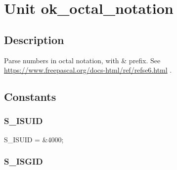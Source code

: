 \documentclass{report}
\newif\ifpdf
\begin{document}
\label{toc}\tableofcontents
\newpage
\newlength{\tmplength}
\chapter{Unit ok{\_}octal{\_}notation}
\label{ok_octal_notation}
\section{Description}
Parse numbers in octal notation, with {\&} prefix. See \href{https://www.freepascal.org/docs-html/ref/refse6.html}{https://www.freepascal.org/docs-html/ref/refse6.html} .
\section{Constants}
\ifpdf
\subsection*{\large{\textbf{S{\_}ISUID}}\normalsize\hspace{1ex}\hrulefill}
\else
\subsection*{S{\_}ISUID}
\fi
\label{ok_octal_notation-S_ISUID}
\begin{list}{}{
\setlength{\itemindent}{0cm}
\setlength{\listparindent}{0cm}
\setlength{\leftmargin}{\evensidemargin}
\addtolength{\leftmargin}{\tmplength}
\settowidth{\labelsep}{X}
\addtolength{\leftmargin}{\labelsep}
\setlength{\labelwidth}{\tmplength}
}
\item[\textbf{Declaration}\hfill]
\ifpdf
\begin{flushleft}
\fi
\begin{ttfamily}
S{\_}ISUID = {\&}4000;\end{ttfamily}

\ifpdf
\end{flushleft}
\fi

\end{list}
\ifpdf
\subsection*{\large{\textbf{S{\_}ISGID}}\normalsize\hspace{1ex}\hrulefill}
\else
\end{document}
